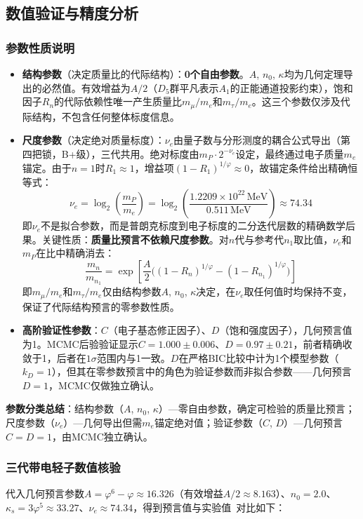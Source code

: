 \documentclass[12pt,a4paper,twocolumn]{article}
\renewcommand{\phi}{\varphi}
\begin{document}
\subsection{数值验证与精度分析}
\subsubsection{参数性质说明}
\begin{itemize}
\item \textbf{结构参数}（决定质量比的代际结构）：\textbf{0个自由参数}。$A$, $n_0$, $\kappa$均为几何定理导出的必然值。有效增益为$A/2$（$D_5$群平凡表示$A_1$的正能通道投影约束），饱和因子$R_n$的代际依赖性唯一产生质量比$m_\mu/m_e$和$m_\tau/m_e$。这三个参数仅涉及代际结构，不包含任何整体标度信息。
\item \textbf{尺度参数}（决定绝对质量标度）：$\nu_e$由量子数与分形测度的耦合公式导出（第四把锁，B+级），三代共用。绝对标度由$m_P \cdot 2^{-\nu_e}$设定，最终通过电子质量$m_e$锚定。由于$n=1$时$R_1\approx 1$，增益项$(1-R_1)^{1/\phi}\approx 0$，故锚定条件给出精确恒等式：
\[
\nu_e = \log_2\!\left(\frac{m_P}{m_e}\right) = \log_2\!\left(\frac{1.2209\times 10^{22}\,\text{MeV}}{0.511\,\text{MeV}}\right) \approx 74.34
\]
即$\nu_e$不是拟合参数，而是普朗克标度到电子标度的二分迭代层数的精确数学后果。关键性质：\textbf{质量比预言不依赖尺度参数}。对$n$代与参考代$n_1$取比值，$\nu_e$和$m_P$在比中精确消去：
\[
\frac{m_n}{m_{n_1}} = \exp\!\left[\frac{A}{2}\Big((1-R_n)^{1/\phi} - (1-R_{n_1})^{1/\phi}\Big)\right]
\]
即$m_\mu/m_e$和$m_\tau/m_e$仅由结构参数$A$, $n_0$, $\kappa$决定，在$\nu_e$取任何值时均保持不变，保证了代际结构预言的零参数性质。
\item \textbf{高阶验证性参数}：$C$（电子基态修正因子）、$D$（饱和强度因子），几何预言值为1。MCMC后验验证显示$C=1.000\pm0.006$、$D=0.97\pm0.21$，前者精确收敛于1，后者在$1\sigma$范围内与1一致。$D$在严格BIC比较中计为1个模型参数（$k_D=1$），但其在零参数预言中的角色为验证参数而非拟合参数——几何预言$D=1$，MCMC仅做独立确认。
\end{itemize}

\noindent\textbf{参数分类总结}：结构参数（$A$, $n_0$, $\kappa$）—零自由参数，确定可检验的质量比预言；尺度参数（$\nu_e$）—几何导出但需$m_e$锚定绝对值；验证参数（$C$, $D$）—几何预言$C=D=1$，由MCMC独立确认。

\subsubsection{三代带电轻子数值核验}
代入几何预言参数$A = \phi^6-\phi \approx 16.326$（有效增益$A/2\approx 8.163$）、$n_0=2.0$、$\kappa_s = 3\phi^5 \approx 33.27$、$\nu_e\approx 74.34$，得到预言值与实验值~\cite{PDG2024}对比如下：
\end{document}
